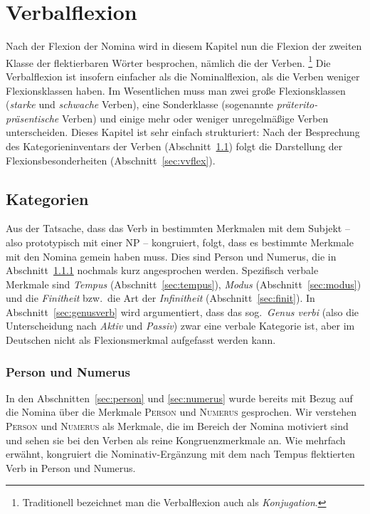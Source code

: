 \chapter{Verbalflexion}

\label{sec:verben}

Nach der Flexion der Nomina wird in diesem Kapitel nun die Flexion der zweiten Klasse der flektierbaren Wörter besprochen, nämlich die der Verben.%
\footnote{Traditionell bezeichnet man die Verbalflexion auch als \textit{Konjugation}.}
Die Verbalflexion ist insofern einfacher als die Nominalflexion, als die Verben weniger Flexionsklassen haben.
Im Wesentlichen muss man zwei große Flexionsklassen (\textit{starke} und \textit{schwache} Verben), eine Sonderklasse (sogenannte \textit{präterito-präsentische} Verben) und einige mehr oder weniger unregelmäßige Verben unterscheiden.
Dieses Kapitel ist sehr einfach strukturiert:
Nach der Besprechung des Kategorieninventars der Verben (Abschnitt~\ref{sec:vkat}) folgt die Darstellung der Flexionsbesonderheiten (Abschnitt~\ref{sec:vvflex}).

\section{Kategorien}

\label{sec:vkat}

Aus der Tatsache, dass das Verb in bestimmten Merkmalen mit dem Subjekt -- also prototypisch mit einer NP -- kongruiert, folgt, dass es bestimmte Merkmale mit den Nomina gemein haben muss.
Dies sind Person und Numerus, die in Abschnitt~\ref{sec:vpersnum} nochmals kurz angesprochen werden.
Spezifisch verbale Merkmale sind \textit{Tempus} (Abschnitt~\ref{sec:tempus}), \textit{Modus} (Abschnitt~\ref{sec:modus}) und die \textit{Finitheit} bzw.\ die Art der \textit{Infinitheit} (Abschnitt~\ref{sec:finit}).
In Abschnitt~\ref{sec:genusverb} wird argumentiert, dass das sog.\ \textit{Genus verbi} (also die Unterscheidung nach \textit{Aktiv} und \textit{Passiv}) zwar eine verbale Kategorie ist, aber im Deutschen nicht als Flexionsmerkmal aufgefasst werden kann.

\subsection{Person und Numerus}

\label{sec:vpersnum}


In den Abschnitten~\ref{sec:person} und \ref{sec:numerus} wurde bereits mit Bezug auf die Nomina über die Merkmale \textsc{Person} und \textsc{Numerus} gesprochen.
Wir verstehen \textsc{Person} und \textsc{Numerus} als Merkmale, die im Bereich der Nomina motiviert sind und sehen sie bei den Verben als reine Kongruenzmerkmale an.
Wie mehrfach erwähnt, kongruiert die Nominativ-Ergänzung mit dem nach Tempus flektierten Verb in Person und Numerus.

